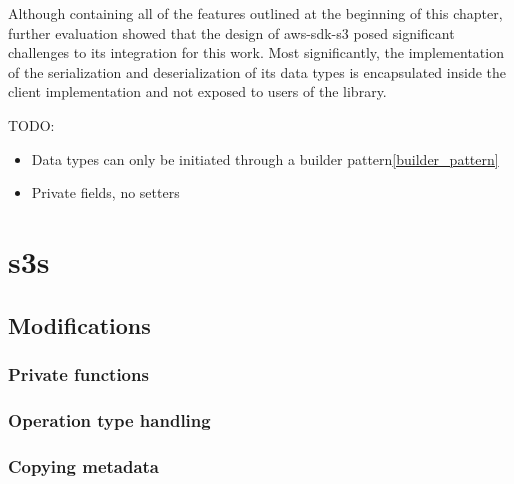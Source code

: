 Although containing all of the features outlined at the beginning of this chapter, further evaluation showed that the design of aws-sdk-s3 posed significant challenges to its integration for this work. Most significantly, the implementation of the serialization and deserialization of its data types is encapsulated inside the client implementation and not exposed to users of the library.


TODO: 
\begin{itemize}
	\item Data types can only be initiated through a builder pattern\ref{builder_pattern}
	\item Private fields, no setters
\end{itemize}

\section{s3s}

\subsection{Modifications}
\subsubsection{Private functions}
\label{s3s_mod_pub}
\subsubsection{Operation type handling}
\label{s3s_mod_op}
\subsubsection{Copying metadata}
\label{s3s_mod_meta}
